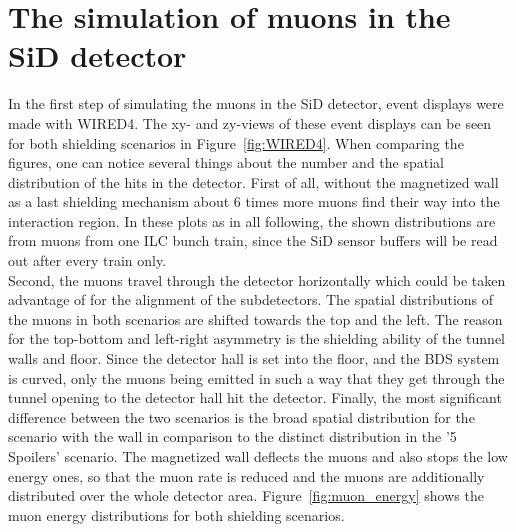 \section{The simulation of muons in the SiD detector}
\label{Detector}

In the first step of simulating the muons in the SiD detector, event displays were made with WIRED4.
The xy- and zy-views of these event displays can be seen for both shielding scenarios in Figure~\ref{fig:WIRED4}.
When comparing the figures, one can notice several things about the number and the spatial distribution of the hits in the detector.
First of all, without the magnetized wall as a last shielding mechanism about 6 times more muons find their way into the interaction region.
In these plots as in all following, the shown distributions are from muons from one ILC bunch train, since the SiD sensor buffers will be read out after every train only.\\
Second, the muons travel through the detector horizontally which could be taken advantage of for the alignment of the subdetectors.
The spatial distributions of the muons in both scenarios are shifted towards the top and the left.
The reason for the top-bottom and left-right asymmetry is the shielding ability of the tunnel walls and floor.
Since the detector hall is set into the floor, and the BDS system is curved, only the muons being emitted in such a way that they get through the tunnel opening to the detector hall hit the detector.
Finally, the most significant difference between the two scenarios is the broad spatial distribution for the scenario with the wall in comparison to the distinct distribution in the '5 Spoilers' scenario.
The magnetized wall deflects the muons and also stops the low energy ones, so that the muon rate is reduced and the muons are additionally distributed over the whole detector area.
Figure~\ref{fig:muon_energy} shows the muon energy distributions for both shielding scenarios.


